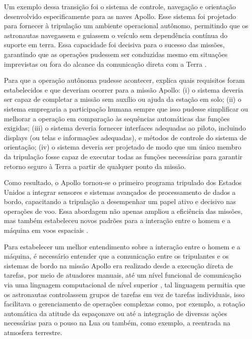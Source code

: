 Um exemplo dessa transição foi o sistema de controle, navegação e orientação desenvolvido especificamente para as naves Apollo. Esse sistema foi projetado para fornecer à tripulação um ambiente operacional autônomo, permitindo que os astronautas navegassem e guiassem o veículo sem dependência contínua do suporte em terra. Essa capacidade foi decisiva para o sucesso das missões, garantindo que as operações pudessem ser conduzidas mesmo em situações imprevistas ou fora do alcance da comunicação direta com a Terra \citep{nevins1971}.

Para que a operação autônoma pudesse acontecer, \citep{nevins1971} explica quais requisitos foram estabelecidos e que deveriam ocorrer para a missão Apollo: (i) o sistema deveria ser capaz de completar a missão sem auxílio ou ajuda da estação em solo; (ii) o sistema empregaria a participação humana sempre que isso pudesse simplificar ou melhorar a operação em comparação às sequências automáticas das funções exigidas; (iii) o sistema deveria fornecer interfaces adequadas ao piloto, incluindo displays (ou telas e informações adequadas), e métodos de controle do sistema de orientação; (iv) o sistema deveria ser projetado de modo que um único membro da tripulação fosse capaz de executar todas as funções necessárias para garantir retorno seguro à Terra a partir de qualquer ponto da missão.

Como resultado, o Apollo tornou-se o primeiro programa tripulado dos Estados Unidos a integrar sensores e sistemas avançados de processamento de dados a bordo, capacitando a tripulação a desempenhar um papel ativo e decisivo nas operações de voo. Essa abordagem não apenas ampliou a eficiência das missões, mas também estabeleceu novos padrões para a interação entre o homem e a máquina em voos espaciais \citep{nevins1971}.

Para estabelecer um melhor entendimento sobre a interação entre o homem e a máquina, é necessário entender que a comunicação entre os tripulantes e os sistemas de bordo na missão Apollo era realizado desde a execução direta de tarefas, por meio de atuadores manuais, até um nível funcional de comunicação via uma linguagem computacional de nível superior \citep{nevins1971}, tal linguagem permitia que os astronautas controlassem grupos de tarefas em vez de tarefas individuais, isso facilitava o gerenciamento de operações complexas como, por exemplo, a rotação automática da atitude da espaçonave ou até a integração de diversas ações necessárias para o pouso na Lua ou também, como exemplo, a reentrada na atmosfera terrestre.

